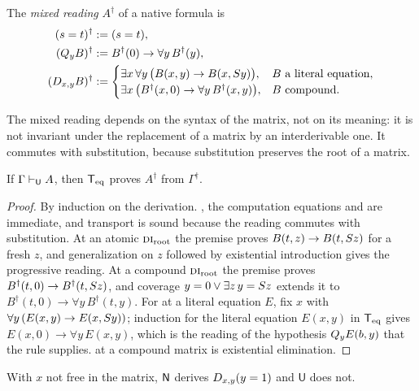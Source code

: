 \begin{definition}
\label{guard:def:mixed}
The \emph{mixed reading} $A^\dagger$ of a native formula is
\begin{align*}
 (s=t)^\dagger &\mathrel{:=} (s=t),\\
 (Q_{y}B)^\dagger &\mathrel{:=} B^\dagger(0)\to\forall y\,B^\dagger(y),\\
 (D_{x,y}B)^\dagger &\mathrel{:=}
 \begin{cases}
  \exists x\,\forall y\,\bigl(B(x,y)\to B(x,S y)\bigr),
    & B \text{ a literal equation},\\
  \exists x\,\bigl(B^\dagger(x,0)\to\forall y\,B^\dagger(x,y)\bigr),
    & B \text{ compound}.
 \end{cases}
\end{align*}
\end{definition}

The mixed reading depends on the syntax of the matrix, not on its meaning:
it is not invariant under the replacement of a matrix by an interderivable
one.  It commutes with substitution, because substitution preserves the
root of a matrix.

\begin{lemma}
\label{guard:lem:mixed-sound}
If $\Gamma\vdash_{\mathsf U}A$, then $\mathsf{T}_{\mathrm{eq}}$ proves $A^\dagger$ from
$\Gamma^\dagger$.
\end{lemma}

\begin{proof}
By induction on the derivation.  , the computation equations
and  are immediate, and transport is sound because the reading
commutes with substitution.  At an atomic $\rulename{DI}_{\mathrm{root}}$
the premise proves $B(t,z)\to B(t,S z)$ for a fresh $z$, and
generalization on $z$ followed by existential introduction gives the
progressive reading.  At a compound $\rulename{DI}_{\mathrm{root}}$ the
premise proves $B^\dagger(t,0)\to B^\dagger(t,S z)$, and coverage
$y=0\vee\exists z\,y=S z$ extends it to
$B^\dagger(t,0)\to\forall y\,B^\dagger(t,y)$.  For  at a
literal equation $E$, fix $x$ with $\forall y\,(E(x,y)\to E(x,S y))$;
induction for the literal equation $E(x,y)$ in $\mathsf{T}_{\mathrm{eq}}$ gives
$E(x,0)\to\forall y\,E(x,y)$, which is the reading of the hypothesis
$Q_{y}E(b,y)$ that the rule supplies.   at a compound matrix is
existential elimination.
\end{proof}

\begin{proposition}
\label{guard:prop:strict}
With $x$ not free in the matrix, $\mathsf{N}$ derives $D_{x,y}(y=1)$ and
$\mathsf U$ does not.
\end{proposition}

